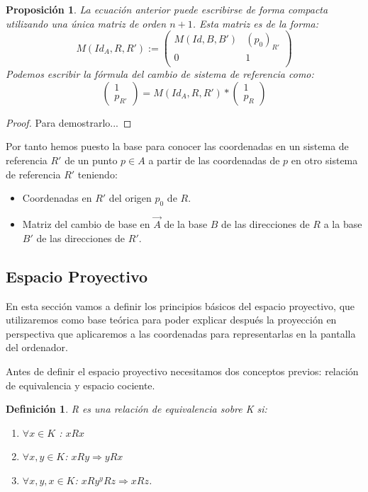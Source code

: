 \documentclass[a4paper,11pt, oneside]{book}
\newtheorem{defi}{Definición}
\newtheorem{prop}{Proposición}
\begin{document}
\begin{prop}
La ecuación anterior puede escribirse de forma compacta utilizando una única matriz de orden $n+1$. Esta matriz es de la forma:
\begin{equation}
M(Id_A, R, R') := 
\begin{pmatrix}
M(Id, B, B') & (p_0)_{R'} \\
0 			 & 1 \\
\end{pmatrix}
\end{equation}
Podemos escribir la fórmula del cambio de sistema de referencia como:
\begin{equation}
\begin{pmatrix}
1 \\
p_{R'}
\end{pmatrix}
 = M(Id_A, R, R')*\begin{pmatrix}
 1 \\
 p_R
 \end{pmatrix}
\end{equation}
\end{prop}
\begin{proof}
	Para demostrarlo...
\end{proof}

Por tanto hemos puesto la base para conocer las coordenadas en un sistema de referencia $R'$ de un punto $p \in A$ a partir de las coordenadas de $p$ en otro sistema de referencia $R'$ teniendo:
\begin{itemize}
	\item Coordenadas en $R'$ del origen $p_0$ de $R$.
	\item Matriz del cambio de base en $\overrightarrow{A}$ de la base $B$ de las direcciones de $R$ a la base $B'$ de las direcciones de $R'$.
\end{itemize}

\subsection{Espacio Proyectivo}

En esta sección vamos a definir los principios básicos del espacio proyectivo, que utilizaremos como base teórica para poder explicar después la proyección en perspectiva que aplicaremos a las coordenadas para representarlas en la pantalla del ordenador.


Antes de definir el espacio proyectivo necesitamos dos conceptos previos: relación de equivalencia y espacio cociente.

\begin{defi}
	R es una relación de equivalencia sobre K si:
	\begin{enumerate}
	\item $\forall x \in K$	: $xRx$
	\item $\forall x,y \in K$: $xRy \Rightarrow yRx$
	\item $\forall x,y,x \in K$: $xRy ^ yRz \Rightarrow xRz$.
	\end{enumerate}
\end{defi}
\end{document}
